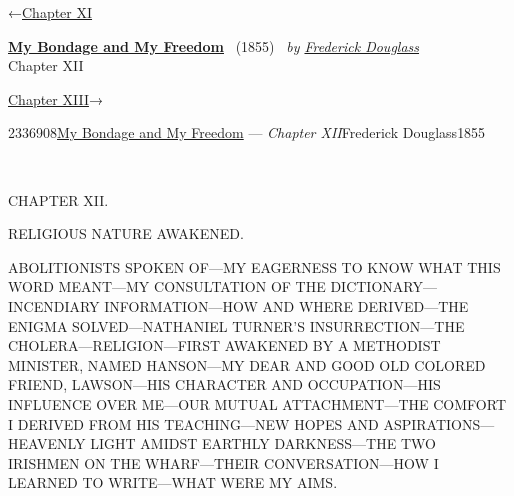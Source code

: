 \hypertarget{headerContainer}{}
\hypertarget{navigationHeader}{}
\protect\hypertarget{headerprevious}{}{←\href{/wiki/My_Bondage_and_My_Freedom_(1855)/Chapter_XI}{Chapter
XI}}

\textbf{\protect\hypertarget{header_title_text}{}{\href{/wiki/My_Bondage_and_My_Freedom_(1855)}{My
Bondage and My Freedom}}} ~(1855)~ \emph{by
\href{/wiki/Author:Frederick_Douglass}{\protect\hypertarget{header_author_text}{}{{Frederick
Douglass}}}}\\
\protect\hypertarget{header_section_text}{}{Chapter XII}

\protect\hypertarget{headernext}{}{\href{/wiki/My_Bondage_and_My_Freedom_(1855)/Chapter_XIII}{Chapter
XIII}→}

\hypertarget{navigationNotes}{}

\hypertarget{ws-data}{}
\protect\hypertarget{ws-article-id}{}{2336908}\protect\hypertarget{ws-title}{}{\href{/wiki/My_Bondage_and_My_Freedom_(1855)}{My
Bondage and My Freedom} --- \emph{Chapter
XII}}\protect\hypertarget{ws-author}{}{Frederick
Douglass}\protect\hypertarget{ws-year}{}{1855}

{\protect\hypertarget{163}{}{}}

~

{CHAPTER XII.}

RELIGIOUS NATURE AWAKENED.

{ABOLITIONISTS SPOKEN OF---MY EAGERNESS TO KNOW WHAT THIS WORD
MEANT---MY CONSULTATION OF THE DICTIONARY---INCENDIARY INFORMATION---HOW
AND WHERE DERIVED---THE ENIGMA SOLVED---NATHANIEL TURNER'S
INSURRECTION---THE CHOLERA---RELIGION---FIRST AWAKENED BY A METHODIST
MINISTER, NAMED HANSON---MY DEAR AND GOOD OLD COLORED FRIEND,
LAWSON---HIS CHARACTER AND OCCUPATION---HIS INFLUENCE OVER ME---OUR
MUTUAL ATTACHMENT---THE COMFORT I DERIVED FROM HIS TEACHING---NEW HOPES
AND ASPIRATIONS---HEAVENLY LIGHT AMIDST EARTHLY DARKNESS---THE TWO
IRISHMEN ON THE WHARF---THEIR CONVERSATION---HOW I LEARNED TO
WRITE---WHAT WERE MY AIMS.}

